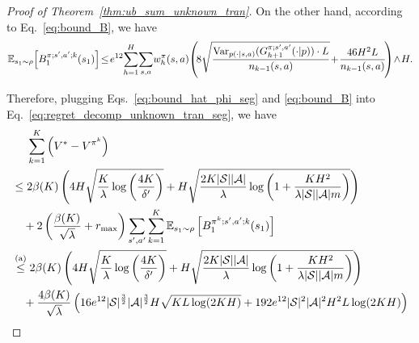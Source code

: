 \begin{proof}[Proof of Theorem~\ref{thm:ub_sum_unknown_tran}]
	On the other hand, according to Eq.~\eqref{eq:bound_B}, we have
	\begin{align*}
		\ex_{s_1 \sim \rho}\!\mbr{B^{\pi;s',a';k}_1(s_1)} \!\leq\! e^{12} \!\sum_{h=1}^{H} \!\sum_{s,a}  \!w^{\pi}_h(s,a)\!  \sbr{\! 8  \sqrt{ \frac{\var_{p(\cdot|s,a)}(G^{\pi;s',a'}_{h+1}(\cdot|p)) \cdot L}{n_{k-1}(s,a)} }  \!+\! \frac{46  H^2L}{n_{k-1}(s,a)} \!} \!\wedge\! H .
	\end{align*}
	
	
	
	Therefore, plugging Eqs.~\eqref{eq:bound_hat_phi_seg} and \eqref{eq:bound_B} into Eq.~\eqref{eq:regret_decomp_unknown_tran_seg}, we have
	\begin{align*}
		&\quad\ \sum_{k=1}^{K} \sbr{ V^*-V^{\pi^k} } 
		\\
		&\leq 2 \beta(K) \sbr{ 4H\sqrt{ \frac{K}{\lambda} \log\sbr{\frac{4K}{\delta'}} } + H \sqrt{ \frac{2K |\cS| |\cA|}{\lambda} \log \sbr{ 1+ \frac{  KH^2 }{ \lambda |\cS| |\cA| m} }} } 
		\\& \quad + 
		2 \sbr{ \frac{\beta(K)}{\sqrt{\lambda}} + r_{\max} } \sum_{s',a'} \sum_{k=1}^{K}  \ex_{s_1 \sim \rho}\mbr{B^{\pi^k;s',a';k}_1(s_1)}
		\\
		&\overset{\textup{(a)}}{\leq} 2 \beta(K) \sbr{ 4H\sqrt{ \frac{K}{\lambda} \log\sbr{\frac{4K}{\delta'}} } + H \sqrt{ \frac{2K |\cS| |\cA|}{\lambda} \log \sbr{ 1+ \frac{  KH^2 }{ \lambda |\cS| |\cA| m } }} } \\&\quad + \frac{4\beta(K)}{\sqrt{\lambda}} \sbr{ 16 e^{12} |\cS|^{\frac{3}{2}} |\cA|^{\frac{3}{2}} H \sqrt{K L \log(2KH) } + 192 e^{12} |\cS|^2 |\cA|^2 H^2 L \log(2KH) } 
		\\

\end{align*}
\end{proof}
